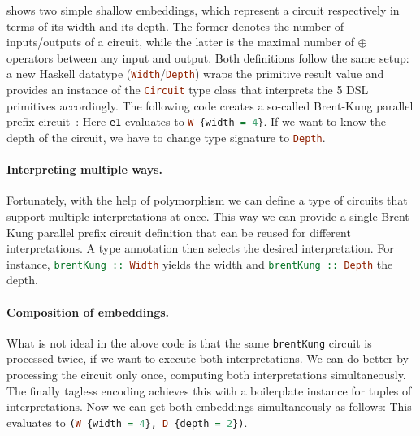  shows two simple shallow embeddings, which represent a circuit
respectively in terms of its width and its depth. The former denotes the number
of inputs/outputs of a circuit, while the latter is the maximal number of
$\oplus$ operators between any input and output.
Both definitions follow the same setup: a new Haskell datatype
(\lstinline[language=haskell]{Width}/\lstinline[language=haskell]{Depth}) wraps the primitive result value and provides an
instance of the \lstinline[language=haskell]{Circuit} type class that interprets the 5 DSL primitives
accordingly.
The following code creates a so-called Brent-Kung parallel prefix circuit~\cite{brent1980chip}:
Here \lstinline[language=haskell]{e1} evaluates to \lstinline[language=haskell]$W {width = 4}$. If we want to know the
depth of the circuit, we have to change type signature to \lstinline[language=haskell]{Depth}.

\paragraph{Interpreting multiple ways.}

Fortunately, with the help of polymorphism we can define a type
of circuits that support multiple interpretations at once.
This way we can provide a single Brent-Kung parallel prefix circuit definition that can be reused
for different interpretations.
A type annotation then selects the desired interpretation.
For instance, \lstinline[language=haskell]{brentKung :: Width} yields the width and
\lstinline[language=haskell]{brentKung :: Depth} the depth.

\paragraph{Composition of embeddings.}

What is not ideal in the above code is that the same \lstinline[language=haskell]{brentKung}
circuit is processed twice, if we want to execute both interpretations. We can do 
better by processing the circuit only once, computing both interpretations simultaneously.
The finally tagless encoding achieves this with a boilerplate instance
for tuples of interpretations.
Now we can get both embeddings simultaneously as follows:
This evaluates to \lstinline[language=haskell]$(W {width = 4}, D {depth = 2})$.

